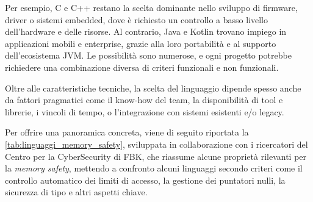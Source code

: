 Per esempio, C e C++ restano la scelta dominante nello sviluppo di firmware, driver
o sistemi embedded, dove è richiesto un controllo a basso livello dell'hardware
e delle risorse. Al contrario, Java e Kotlin trovano impiego in applicazioni
mobili e enterprise, grazie alla loro portabilità e al supporto dell'ecosistema JVM.
Le possibilità sono numerose, e ogni progetto potrebbe richiedere una combinazione
diversa di criteri funzionali e non funzionali.

Oltre alle caratteristiche tecniche, la scelta del linguaggio dipende spesso
anche da fattori pragmatici come il know-how del team, la disponibilità di tool e
librerie, i vincoli di tempo, o l'integrazione con sistemi esistenti e/o legacy.

Per offrire una panoramica concreta, viene di seguito riportata la
\autoref{tab:linguaggi_memory_safety}, sviluppata in collaborazione con i ricercatori
del Centro per la CyberSecurity di FBK, che riassume alcune proprietà rilevanti
per la \textit{memory safety}, mettendo a confronto alcuni linguaggi secondo
criteri come il controllo automatico dei limiti di accesso, la gestione dei puntatori
nulli, la sicurezza di tipo e altri aspetti chiave.

